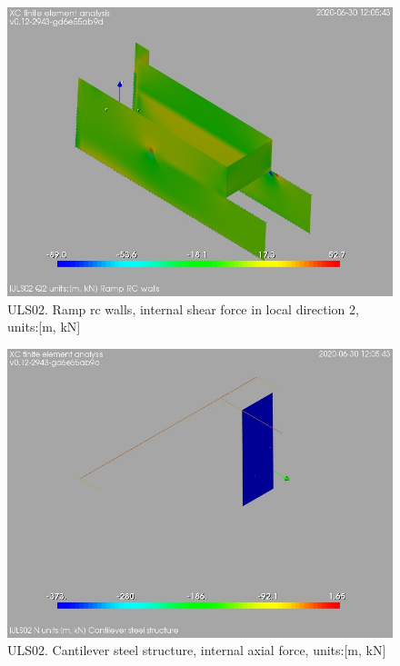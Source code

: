 \begin{figure}
\begin{center}
\includegraphics[width=\linewidth]{ramp_wall/resLC/text/graphics/resSimplLC/lULS02wallsQ2}
\caption{ULS02. Ramp rc walls, internal shear force in local direction 2, units:[m, kN]}
\end{center}
\end{figure}
\begin{figure}
\begin{center}
\includegraphics[width=\linewidth]{ramp_wall/resLC/text/graphics/resSimplLC/lULS02steelMembersN}
\caption{ULS02. Cantilever steel structure, internal axial force, units:[m, kN]}
\end{center}
\end{figure}
